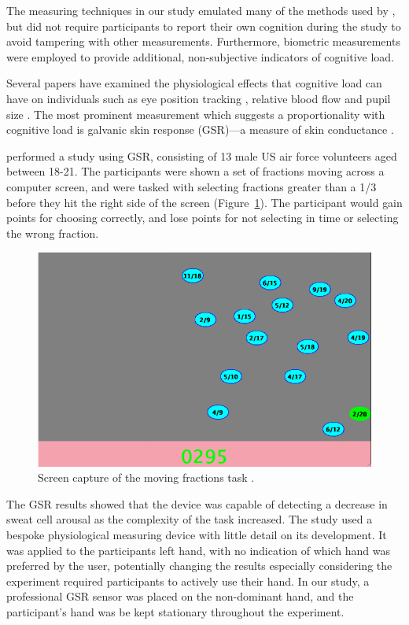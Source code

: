 \documentclass[conference]{IEEEtran}
\begin{document}
The measuring techniques in our study emulated many of the methods used by \citet{deleeuw2008comparison}, but did not require participants to report their own cognition during the study to avoid tampering with other measurements. Furthermore, biometric measurements were employed to provide additional, non-subjective indicators of cognitive load.

Several papers have examined the physiological effects that cognitive load can have on individuals such as eye position tracking \cite{palinko2010estimating}, relative blood flow \cite{ikehara2005assessing} and pupil size \cite{partala2003pupil}. The most prominent measurement which suggests a proportionality with cognitive load is galvanic skin response (GSR)---a measure of skin conductance \cite{shi2007galvanic,nourbakhsh2012using}. 

\citet{ikehara2005assessing} performed a study using GSR, consisting of 13 male US air force volunteers aged between 18-21. The participants were shown a set of fractions moving across a computer screen, and were tasked with selecting fractions greater than a 1/3 before they hit the right side of the screen (Figure~\ref{fig:MovingfracitonsTask}). The participant would gain points for choosing correctly, and lose points for not selecting in time or selecting the wrong fraction.

\begin{figure}[h!]
    \centering
    \includegraphics[width=0.95\linewidth]{figures/ScreenCaptureFractions.PNG}
    \caption{Screen capture of the moving fractions task \cite{ikehara2005assessing}.}
    \label{fig:MovingfracitonsTask}
\end{figure}

The GSR results showed that the device was capable of detecting a decrease in sweat cell arousal as the complexity of the task increased. The study used a bespoke physiological measuring device with little detail on its development. It was applied to the participants left hand, with no indication of which hand was preferred by the user, potentially changing the results especially considering the experiment required participants to actively use their hand. In our study, a professional GSR sensor was placed on the non-dominant hand, and the participant's hand was be kept stationary throughout the experiment.
\end{document}
